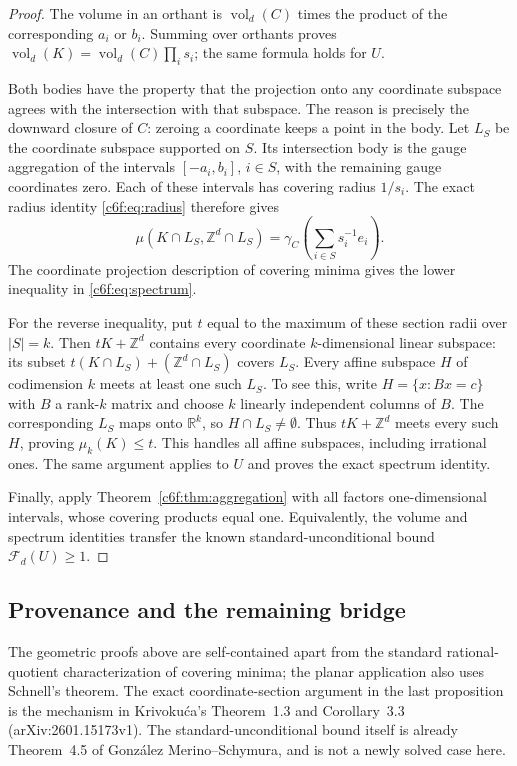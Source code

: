 \documentclass[11pt,a4paper]{article}
\theoremstyle{remark}\newtheorem{remark}[theorem]{Remark}
\begin{document}
\begin{proof}
The volume in an orthant is $\operatorname{vol}_d(C)$ times
the product of the corresponding $a_i$ or $b_i$.  Summing over
orthants proves
$\operatorname{vol}_d(K)=\operatorname{vol}_d(C)\prod_i s_i$;
the same formula holds for $U$.

Both bodies have the property that the projection onto any
coordinate subspace agrees with the intersection with that
subspace.  The reason is precisely the downward closure of $C$:
zeroing a coordinate keeps a point in the body.  Let $L_S$ be the
coordinate subspace supported on $S$.  Its intersection body is
the gauge aggregation of the intervals $[-a_i,b_i]$, $i\in S$,
with the remaining gauge coordinates zero.  Each of these intervals
has covering radius $1/s_i$.  The exact radius identity
\eqref{c6f:eq:radius} therefore gives
\[
 \mu(K\cap L_S,\mathbb Z^d\cap L_S)
       =\gamma_C\left(\sum_{i\in S}s_i^{-1}e_i\right).
\]
The coordinate projection description of covering minima gives
the lower inequality in \eqref{c6f:eq:spectrum}.

For the reverse inequality, put $t$ equal to the maximum of these
section radii over $|S|=k$.  Then $tK+\mathbb Z^d$ contains every
coordinate $k$-dimensional linear subspace: its subset
$t(K\cap L_S)+(\mathbb Z^d\cap L_S)$ covers $L_S$.
Every affine subspace $H$ of codimension $k$ meets at least one
such $L_S$.  To see this, write $H=\{x:Bx=c\}$ with $B$ a
rank-$k$ matrix and choose $k$ linearly independent columns of
$B$.  The corresponding $L_S$ maps onto $\mathbb R^k$, so
$H\cap L_S\ne\emptyset$.  Thus $tK+\mathbb Z^d$ meets
every such $H$, proving $\mu_k(K)\le t$.  This handles all
affine subspaces, including irrational ones.  The same argument
applies to $U$ and proves the exact spectrum identity.

Finally, apply Theorem~\ref{c6f:thm:aggregation} with all factors
one-dimensional intervals, whose covering products equal one.
Equivalently, the volume and spectrum identities transfer the
known standard-unconditional bound $\mathcal F_d(U)\ge1$.
\end{proof}

\subsection{Provenance and the remaining bridge}

The geometric proofs above are self-contained apart from the
standard rational-quotient characterization of covering minima;
the planar application also uses Schnell's theorem.  The exact
coordinate-section argument in the last proposition is the
mechanism in Krivoku\'ca's Theorem~1.3 and Corollary~3.3
(arXiv:2601.15173v1).  The standard-unconditional bound itself
is already Theorem~4.5 of Gonz\'alez Merino--Schymura, and is
not a newly solved case here.
\end{document}
